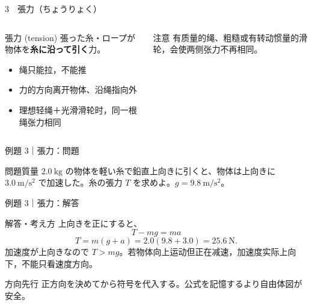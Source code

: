 \documentclass[notheorems,aspectratio=169]{beamer}
\newcommand{\key}[1]{\textbf{\color{ChinaRed}#1}}
\newcommand{\en}[1]{\textcolor{GraphGray}{\scriptsize(#1)}}
\newcommand{\qcard}[1]{%
  \begin{block}{問題}\centering\large #1\end{block}}
\newcommand{\acard}[1]{%
  \begin{exampleblock}{解答・考え方}#1\end{exampleblock}}
\newcommand{\forcearrow}[5]{%
  \draw[-{Latex[length=3mm]},very thick,#5] (#1,#2)--++(#3,#4);}
\begin{document}
\begin{frame}{3　張力（ちょうりょく）}
\begin{columns}[c]
\begin{block}{張力 \en{tension}}
張った糸・ロープが物体を\key{糸に沿って引く}力。
\begin{itemize}
  \item 绳只能拉，不能推
  \item 力的方向离开物体、沿绳指向外
  \item 理想轻绳＋光滑滑轮时，同一根绳张力相同
\end{itemize}
\end{block}
\begin{alertblock}{注意}
有质量的绳、粗糙或有转动惯量的滑轮，会使两侧张力不再相同。
\end{alertblock}
\centering
{}
\end{columns}
\end{frame}

\begin{frame}{例題 3｜張力：問題}
\vfill
\qcard{質量 $2.0\ \mathrm{kg}$ の物体を軽い糸で鉛直上向きに引くと、物体は上向きに $3.0\ \mathrm{m/s^2}$ で加速した。糸の張力 $T$ を求めよ。$g=9.8\ \mathrm{m/s^2}$。}
\vfill
\end{frame}

\begin{frame}{例題 3｜張力：解答}
\acard{
上向きを正にすると、
\[
T-mg=ma
\]
\[
T=m(g+a)=2.0(9.8+3.0)=\boxed{25.6\ \mathrm N}.
\]
加速度が上向きなので $T>mg$。若物体向上运动但正在减速，加速度实际上向下，不能只看速度方向。}
\begin{alertblock}{方向先行}
正方向を決めてから符号を代入する。公式を記憶するより自由体図が安全。
\end{alertblock}
\end{frame}
\end{document}
